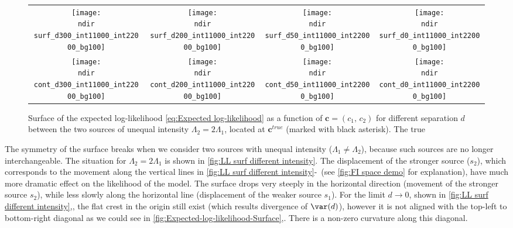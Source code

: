 \begin{figure}[!thb]
	\centering
	\newcommand{\sizeff}{.18}
	\newcommand{\sizegg}{.16}
	\newcommand{\ndir}{\qd gFREM/images/LLsurface/}
	\begin{tabular}{cccc}
		\subfloat[$d=300$ nm]{\texttt{[image: \\ndir surf\_d300\_int11000\_int22000\_bg100]}} 		
		& \subfloat[$d=200$ nm]{\texttt{[image: \\ndir surf\_d200\_int11000\_int22000\_bg100]}} 		
		& \subfloat[$d=50$ nm]{\texttt{[image: \\ndir surf\_d50\_int11000\_int22000\_bg100]}} 		
		& \subfloat[$d=0$ nm]{\texttt{[image: \\ndir surf\_d0\_int11000\_int22000\_bg100]}} 		
		\tabularnewline
		\subfloat[$d=300$ nm]{\texttt{[image: \\ndir cont\_d300\_int11000\_int22000\_bg100]}} 
		& \subfloat[$d=200$ nm]{\texttt{[image: \\ndir cont\_d200\_int11000\_int22000\_bg100]}} 		
		& \subfloat[$d=50$ nm]{\texttt{[image: \\ndir cont\_d50\_int11000\_int22000\_bg100]}} 		
		& \subfloat[$d=0$ nm]{\texttt{[image: \\ndir cont\_d0\_int11000\_int22000\_bg100]}} 		
		\tabularnewline
	\end{tabular}
	\caption{Surface of the expected log-likelihood \autoref{eq:Expected log-likelihood} as a function of $\bm{c}=(c_1,\, c_2)$ for different separation $d$ between the two sources of unequal intensity $\Lambda_2=2\Lambda_1$, located at $\bm{c}^{true}$ (marked with black asterisk). The true }	
	\label{fig:LL surf different intensity}
\end{figure}
%
The symmetry of the surface breaks when we consider two sources with unequal intensity ($\Lambda_1\neq\Lambda_2$), because such sources are no longer interchangeable. The situation for $\Lambda_2=2\Lambda_1$ is shown in \autoref{fig:LL surf different intensity}. The displacement of the stronger source ($s_2$), which corresponds to the movement along the vertical lines in \autoref{fig:LL surf different intensity}\eee-\hhh\ (see \autoref{fig:FI space demo} for explanation), have much more dramatic effect on the likelihood of the model. The surface drops very steeply in the horizontal direction (movement of the stronger source $s_2$), while less slowly along the horizontal line (displacement of the weaker source $s_1$). For the limit $d\rightarrow 0$, shown in \autoref{fig:LL surf different intensity}\ddd,\hhh, the flat crest in the origin still exist (which results divergence of $\var(d)$), however it is not aligned with the top-left to bottom-right diagonal as we could see in \autoref{fig:Expected-log-likelihood-Surface}\ddd,\hhh. There is a non-zero curvature along this diagonal.

